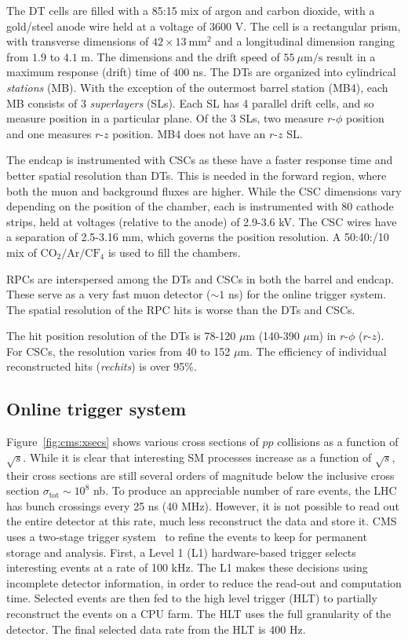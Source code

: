 The DT cells are filled with a 85:15 mix of argon and carbon dioxide, with a gold/steel anode wire held at a voltage of $3600$ V.
The cell is a rectangular prism, with transverse dimensions of $42\times13~\mathrm{mm}^2$ and a longitudinal dimension ranging from $1.9$ to $4.1$ m.
The dimensions and the drift speed of $55~\mu\mathrm{m/s}$ result in a maximum response (drift) time of $400$ ns.
The DTs are organized into cylindrical \emph{stations} (MB).
With the exception of the outermost barrel station (MB4), each MB consists of 3 \emph{superlayers} (SLs).
Each SL has 4 parallel drift cells, and so measure position in a particular plane.
Of the 3 SLs, two measure $r$-$\phi$ position and one measures $r$-$z$ position. 
MB4 does not have an $r$-$z$ SL.

The endcap is instrumented with CSCs as these have a faster response time and better spatial resolution than DTs.
This is needed in the forward region, where both the muon and background fluxes are higher.
While the CSC dimensions vary depending on the position of the chamber, each is instrumented with 80 cathode strips, held at voltages (relative to the anode) of 2.9-3.6 kV.
The CSC wires have a separation of 2.5-3.16 mm, which governs the position resolution.
A 50:40:/10 mix of $\mathrm{CO}_2/\mathrm{Ar}/\mathrm{CF}_4$ is used to fill the chambers.

RPCs are interspersed among the DTs and CSCs in both the barrel and endcap. 
These serve as a very fast muon detector ($\sim 1$ ns) for the online trigger system. 
The spatial resolution of the RPC hits is worse than the DTs and CSCs.

The hit position resolution of the DTs is 78-120 $\mu$m (140-390 $\mu$m) in $r$-$\phi$ ($r$-$z$).
For CSCs, the resolution varies from 40 to 152 $\mu$m.
The efficiency of individual reconstructed hits (\emph{rechits}) is over 95\%.

\subsection{Online trigger system}

Figure~\ref{fig:cms:xsecs} shows various cross sections of $pp$ collisions as a function of $\sqrt{s}$.
While it is clear that interesting SM processes increase as a function of $\sqrt{s}$, their cross sections are still several orders of magnitude below the inclusive cross section $\sigma_\mathrm{tot}\sim 10^8$ nb.
To produce an appreciable number of rare events, the LHC has bunch crossings every 25 ns (40 MHz).
However, it is not possible to read out the entire detector at this rate, much less reconstruct the data and store it.
CMS uses a two-stage trigger system~\cite{cmstrig} to refine the events to keep for permanent storage and analysis.
First, a Level 1 (L1) hardware-based trigger selects interesting events at a rate of 100 kHz.
The L1 makes these decisions using incomplete detector information, in order to reduce the read-out and computation time.
Selected events are then fed to the high level trigger (HLT) to partially reconstruct the events on a CPU farm.
The HLT uses the full granularity of the detector.
The final selected data rate from the HLT is 400 Hz.

